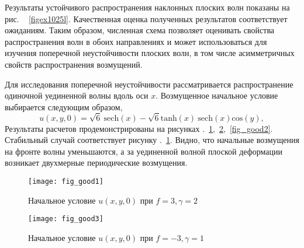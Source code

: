 Результаты устойчивого распространения наклонных плоских волн показаны на рис. ~ \ref{figex1025l}. Качественная оценка полученных результатов соответствует ожиданиям. Таким образом, численная схема позволяет оценивать свойства распространения волн в обоих направлениях и может использоваться для изучения поперечной неустойчивости плоских волн, в том числе асимметричных свойств распространения возмущений.

Для исследования поперечной неустойчивости рассматривается распространение одиночной уединенной волны вдоль оси $ x $. Возмущенное начальное условие выбирается следующим образом,
\begin{equation}
	u(x,y,0) = \sqrt{6} ~{\text{sech}}(x)-\sqrt{6}{\text{tanh}} (x) ~{\text{sech}}(x) {\text{cos}} (y),
\end{equation}
Результаты расчетов продемонстрированы на рисунках .~\ref{fig_good1},~\ref{fig_good3},~\ref{fig_good2}. 
Стабильный случай соответствует рисунку .~\ref{fig_good1}.
Видно, что начальные возмущения на фронте волны уменьшаются, а за уединенной волной плоской деформации возникает двухмерные периодические возмущения.

\begin{figure}
	\centering
	\texttt{[image: fig\_good1]}
	\caption{Начальное условие $u(x,y,0)$ при $f = 3, \gamma = 2$} \label{fig_good1}
\end{figure}

\begin{figure}
	\centering
	\texttt{[image: fig\_good3]}
	\caption{Начальное условие $u(x,y,0)$ при $f = -3, \gamma = 1$} \label{fig_good3}	
\end{figure}

